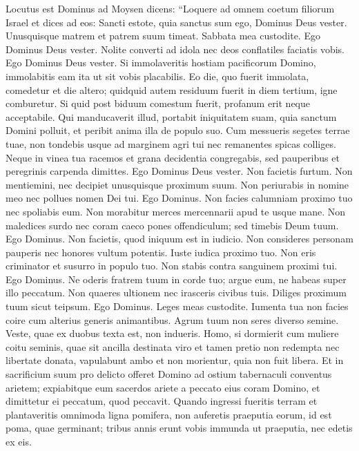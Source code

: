 \begin{biblechapter}  
\verse Locutus est Dominus ad Moysen dicens: 
\verse “Loquere ad omnem coetum filiorum Israel et dices ad eos: Sancti estote, quia sanctus sum ego, Dominus Deus vester. 
\verse Unusquisque matrem et patrem suum timeat. Sabbata mea custodite. Ego Dominus Deus vester. 
\verse Nolite converti ad idola nec deos conflatiles faciatis vobis. Ego Dominus Deus vester. 
\verse Si immolaveritis hostiam pacificorum Domino, immolabitis eam ita ut sit vobis placabilis. 
\verse Eo die, quo fuerit immolata, comedetur et die altero; quidquid autem residuum fuerit in diem tertium, igne comburetur. 
\verse Si quid post biduum comestum fuerit, profanum erit neque acceptabile. 
\verse Qui manducaverit illud, portabit iniquitatem suam, quia sanctum Domini polluit, et peribit anima illa de populo suo. 
\verse Cum messueris segetes terrae tuae, non tondebis usque ad marginem agri tui nec remanentes spicas colliges. 
\verse Neque in vinea tua racemos et grana decidentia congregabis, sed pauperibus et peregrinis carpenda dimittes. Ego Dominus Deus vester. 
\verse Non facietis furtum. Non mentiemini, nec decipiet unusquisque proximum suum. 
\verse Non periurabis in nomine meo nec pollues nomen Dei tui. Ego Dominus. 
\verse Non facies calumniam proximo tuo nec spoliabis eum. Non morabitur merces mercennarii apud te usque mane. 
\verse Non maledices surdo nec coram caeco pones offendiculum; sed timebis Deum tuum. Ego Dominus. 
\verse Non facietis, quod iniquum est in iudicio. Non consideres personam pauperis nec honores vultum potentis. Iuste iudica proximo tuo. 
\verse Non eris criminator et susurro in populo tuo. Non stabis contra sanguinem proximi tui. Ego Dominus. 
\verse Ne oderis fratrem tuum in corde tuo; argue eum, ne habeas super illo peccatum. 
\verse Non quaeres ultionem nec irasceris civibus tuis. Diliges proximum tuum sicut teipsum. Ego Dominus. 
\verse Leges meas custodite. Iumenta tua non facies coire cum alterius generis animantibus. Agrum tuum non seres diverso semine. Veste, quae ex duobus texta est, non indueris. 
\verse Homo, si dormierit cum muliere coitu seminis, quae sit ancilla destinata viro et tamen pretio non redempta nec libertate donata, vapulabunt ambo et non morientur, quia non fuit libera. 
\verse Et in sacrificium suum pro delicto offeret Domino ad ostium tabernaculi conventus arietem; 
\verse expiabitque eum sacerdos ariete a peccato eius coram Domino, et dimittetur ei peccatum, quod peccavit. 
\verse Quando ingressi fueritis terram et plantaveritis omnimoda ligna pomifera, non auferetis praeputia eorum, id est poma, quae germinant; tribus annis erunt vobis immunda ut praeputia, nec edetis ex eis. 

\end{biblechapter}
